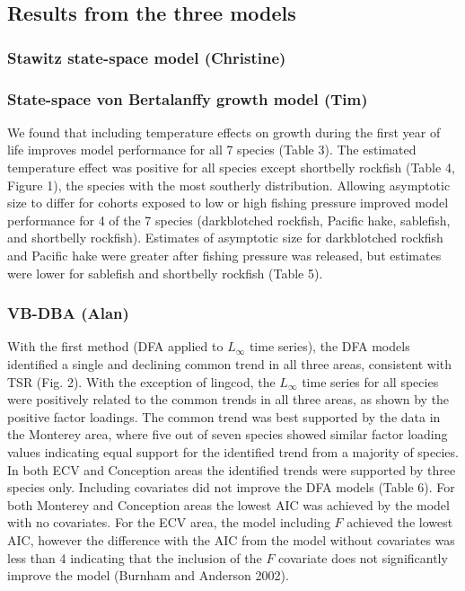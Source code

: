\documentclass[
]{article}
\begin{document}
\hypertarget{results-from-the-three-models}{%
\subsection{Results from the three
models}\label{results-from-the-three-models}}

\hypertarget{stawitz-state-space-model-christine}{%
\subsubsection{Stawitz state-space model
(Christine)}\label{stawitz-state-space-model-christine}}

\hypertarget{state-space-von-bertalanffy-growth-model-tim}{%
\subsubsection{State-space von Bertalanffy growth model
(Tim)}\label{state-space-von-bertalanffy-growth-model-tim}}

We found that including temperature effects on growth during the first
year of life improves model performance for all 7 species (Table 3). The
estimated temperature effect was positive for all species except
shortbelly rockfish (Table 4, Figure 1), the species with the most
southerly distribution. Allowing asymptotic size to differ for cohorts
exposed to low or high fishing pressure improved model performance for 4
of the 7 species (darkblotched rockfish, Pacific hake, sablefish, and
shortbelly rockfish). Estimates of asymptotic size for darkblotched
rockfish and Pacific hake were greater after fishing pressure was
released, but estimates were lower for sablefish and shortbelly rockfish
(Table 5).

\hypertarget{vb-dba-alan}{%
\subsubsection{VB-DBA (Alan)}\label{vb-dba-alan}}

With the first method (DFA applied to \(L_{\infty}\) time series), the
DFA models identified a single and declining common trend in all three
areas, consistent with TSR (Fig. 2). With the exception of lingcod, the
\(L_{\infty}\) time series for all species were positively related to
the common trends in all three areas, as shown by the positive factor
loadings. The common trend was best supported by the data in the
Monterey area, where five out of seven species showed similar factor
loading values indicating equal support for the identified trend from a
majority of species. In both ECV and Conception areas the identified
trends were supported by three species only. Including covariates did
not improve the DFA models (Table 6). For both Monterey and Conception
areas the lowest AIC was achieved by the model with no covariates. For
the ECV area, the model including \(F\) achieved the lowest AIC, however
the difference with the AIC from the model without covariates was less
than 4 indicating that the inclusion of the \(F\) covariate does not
significantly improve the model (Burnham and Anderson 2002).
\end{document}
